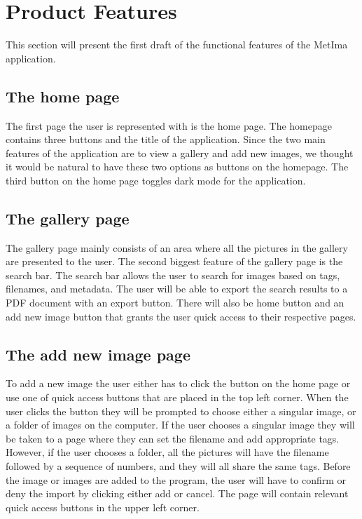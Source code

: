 \documentclass{article}
\begin{document}
\section{Product Features}
This section will present the first draft of the functional features of the MetIma application.

\subsection{The home page}
The first page the user is represented with is the home page. The homepage contains three buttons and the title of the application. Since the two main features of the application are to view a gallery and add new images, we thought it would be natural to have these two options as buttons on the homepage. The third button on the home page toggles dark mode for the application.

\subsection{The gallery page}
The gallery page mainly consists of an area where all the pictures in the gallery are presented to the user. The second biggest feature of the gallery page is the search bar. The search bar allows the user to search for images based on tags, filenames, and metadata. The user will be able to export the search results to a PDF document with an export button. There will also be home button and an add new image button that grants the user quick access to their respective pages.

\subsection{The add new image page}
 To add a new image the user either has to click the button on the home page or use one of quick access buttons that are placed in the top left corner. When the user clicks the button they will be prompted to choose either a singular image, or a folder of images on the computer. If the user chooses a singular image they will be taken to a page where they can set the filename and add appropriate tags. However, if the user chooses a folder, all the pictures will have the filename followed by a sequence of numbers, and they will all share the same tags. Before the image or images are added to the program, the user will have to confirm or deny the import by clicking either add or cancel. The page will contain relevant quick access buttons in the upper left corner. 
\end{document}

